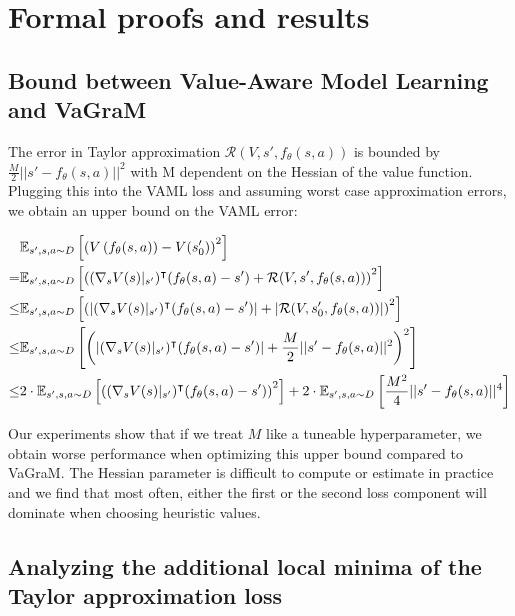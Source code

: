 \chapter{Formal proofs and results}

\section{Bound between Value-Aware Model Learning and VaGraM}
\label{app:taylor_bound}

The error in Taylor approximation $\mathcal{R}(V, s', f_\theta(s,a))$ is bounded by $\frac{M}{2}||s' - f_\theta(s,a)||^2$ with M dependent on the Hessian of the value function. Plugging this into the VAML loss and assuming worst case approximation errors, we obtain an upper bound on the VAML error:

\begin{align*}
    &\mathbb{E}_{s',s,a \sim D}\left[\left(V\left(f_\theta(s,a) \right) - V(s_0')\right)^2\right] \\
    = &\mathbb{E}_{s',s,a \sim D}\left[\left((\nabla_s V(s)|_{s'})^\intercal (f_\theta(s,a) - s') + \mathcal{R}(V, s',f_\theta(s,a))\right)^2\right]\\
    \leq &\mathbb{E}_{s',s,a \sim D}\left[\left(\left|(\nabla_s V(s)|_{s'})^\intercal (f_\theta(s,a) - s')\right| + \left|\mathcal{R}(V, s_0', f_\theta(s,a))\right|\right)^2\right]\\
    \leq &\mathbb{E}_{s',s,a \sim D}\left[{\left(\left|(\nabla_s V(s)|_{s'})^\intercal (f_\theta(s,a) - s')\right| + \frac{M}{2}||s' - f_\theta(s,a)||^2\right)^2}\right]\\
    \leq &2\cdot\mathbb{E}_{s',s,a \sim D}\left[{\left((\nabla_s V(s)|_{s'})^\intercal (f_\theta(s,a) - s')\right)^2}\right] + 2\cdot\mathbb{E}_{s',s,a \sim D}\left[\frac{M^2}{4}||s' - f_\theta(s,a)||^4\right]
\end{align*}

Our experiments show that if we treat $M$ like a tuneable hyperparameter, we obtain worse performance when optimizing this upper bound compared to  VaGraM.
The Hessian parameter is difficult to compute or estimate in practice and we find that most often, either the first or the second loss component will dominate when choosing heuristic values.

\section{Analyzing the additional local minima of the Taylor approximation loss}


